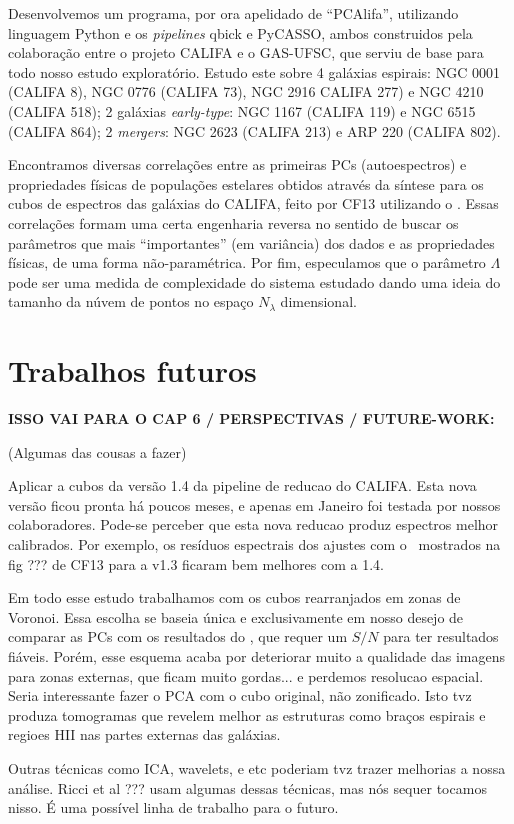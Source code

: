 Desenvolvemos um programa, por ora apelidado de ``PCAlifa'', utilizando linguagem Python e os {\em pipelines} {\sc
qbick} e PyCASSO, ambos construidos pela colaboração entre o projeto CALIFA e o GAS-UFSC, que serviu de base para todo
nosso estudo exploratório. Estudo este sobre 4 galáxias espirais: NGC 0001 (CALIFA 8), NGC 0776 (CALIFA 73), NGC 2916
CALIFA 277) e NGC 4210 (CALIFA 518); 2 galáxias {\em early-type}: NGC 1167 (CALIFA 119) e NGC 6515 (CALIFA 864); 2 {\em
mergers}: NGC 2623 (CALIFA 213) e ARP 220 (CALIFA 802). 

Encontramos diversas correlações entre as primeiras PCs (autoespectros) e propriedades físicas de populações estelares
obtidos através da síntese para os cubos de espectros das galáxias do CALIFA, feito por CF13 utilizando o \starlight.
Essas correlações formam uma certa engenharia reversa no sentido de buscar os parâmetros que mais ``importantes'' (em
variância) dos dados e as propriedades físicas, de uma forma não-paramétrica. Por fim, especulamos que o parâmetro
$\Lambda$ pode ser uma medida de complexidade do sistema estudado dando uma ideia do tamanho da núvem de pontos no
espaço $N_\lambda$ dimensional.

\section{Trabalhos futuros}

{\bf\ojo ISSO VAI PARA O CAP 6 / PERSPECTIVAS / FUTURE-WORK: 

(Algumas das cousas a fazer)

Aplicar a cubos da versão 1.4 da pipeline de reducao do CALIFA. Esta nova versão ficou pronta há poucos meses, e apenas
em Janeiro foi testada por nossos colaboradores. Pode-se perceber que esta nova reducao produz espectros melhor
calibrados. Por exemplo, os resíduos espectrais dos ajustes com o \starlight\ mostrados na fig ??? de CF13 para a v1.3
ficaram bem melhores com a 1.4.

Em todo esse estudo trabalhamos com os cubos rearranjados em zonas de Voronoi. Essa escolha se baseia única e
exclusivamente em nosso desejo de comparar as PCs com os resultados do \starlight, que requer um $S/N$ para ter
resultados fiáveis. Porém, esse esquema acaba por deteriorar muito a qualidade das imagens para zonas externas, que
ficam muito gordas... e perdemos resolucao espacial. Seria interessante fazer o PCA com o cubo original, não zonificado.
Isto tvz produza tomogramas que revelem melhor as estruturas como braços espirais e regioes HII nas partes externas das
galáxias.

Outras técnicas como ICA, wavelets, e etc poderiam tvz trazer melhorias a nossa análise. Ricci et al ??? usam algumas
dessas técnicas, mas nós sequer tocamos nisso. É uma possível linha de trabalho para o futuro.
}
